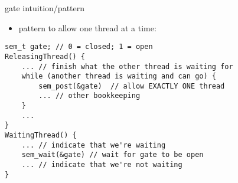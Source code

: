 
\begin{frame}[fragile,label=gatePattern]{gate intuition/pattern}
    \begin{itemize}
    \item pattern to allow one thread at a time:
    \end{itemize}
\begin{visibleenv}
\begin{lstlisting}[style=small]
sem_t gate; // 0 = closed; 1 = open
ReleasingThread() {
    ... // finish what the other thread is waiting for
    while (another thread is waiting and can go) {
        sem_post(&gate)  // allow EXACTLY ONE thread
        ... // other bookkeeping
    }
    ...
}
WaitingThread() {
    ... // indicate that we're waiting
    sem_wait(&gate) // wait for gate to be open
    ... // indicate that we're not waiting
}
\end{lstlisting}
\end{visibleenv}
\end{frame}

